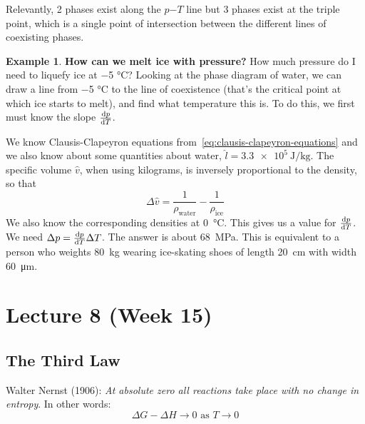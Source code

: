 \documentclass[12pt,chapterprefix=false,dvipsnames]{scrbook}
\theoremstyle{dotless}
\theoremstyle{definition}
\newtheorem{protoexample}{Example}[section]
\newenvironment{example}
{\colorlet{shadecolor}{red!15}\begin{shaded}\begin{protoexample}}
			{\end{protoexample}\end{shaded}}
\begin{document}
Relevantly, 2 phases exist along the $p\mathrm{-}T$
line but 3 phases exist at the triple point, which is a single
point of intersection between the different lines of coexisting
phases.

\begin{example}
	\textbf{How can we melt ice with pressure?}
	How much pressure do I need to liquefy ice at
	\num{-5} \unit{\celsius}? Looking at the
	phase diagram of water, we can draw a line from
	\num{-5} \unit{\celsius} to the line of
	coexistence (that's the critical point at which ice starts to
	melt), and find what temperature this is. To do this, we first
	must know the slope $\dv{p}{T}$.
	\begin{center}
	\end{center}

	We know Clausis-Clapeyron equations from~\ref{eq:clausis-clapeyron-equations}
	and we also know about some quantities about water,
	$ \hat{l} = \SI{3.3e5}{\joule \per\kilogram}$. The specific volume
	$ \hat{v} $, when using kilograms, is inversely
	proportional to the density, so that
	\begin{equation}
		\Delta \hat{v}
		=
		\frac{1}{\rho_\mathrm{water}} - \frac{1}{\rho_\mathrm{ice}}
	\end{equation}
	We also know the corresponding densities at
	\SI{0}{\celsius}. This gives us a value for
	$\dv{p}{T}$. We need $\Delta p = \dv{p}{T} \Delta T$. The
	answer is about \SI{68}{\mega\pascal}. This is equivalent to a
	person who weights \SI{80}{\kilogram} wearing ice-skating
	shoes of length \SI{20}{\centi\metre} with width
	\SI{60}{\micro\metre}.
\end{example}

\chapter{Lecture 8 (Week 15)}%
\label{cha:lecture_8}

\section{The Third Law}%
\label{sec:the_third_law}

Walter Nernst (1906): \textit{At absolute zero all reactions take place with no change in
	entropy}. In other words:
\begin{equation}
	\Delta G - \Delta H \rightarrow 0
	\,\,\mathrm{as}\,\, T \rightarrow 0
\end{equation}
\end{document}
